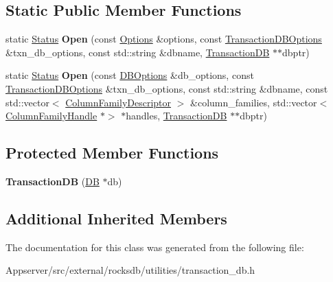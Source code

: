 \subsection*{Static Public Member Functions}
\begin{DoxyCompactItemize}
\item 
static \hyperlink{classrocksdb_1_1Status}{Status} {\bfseries Open} (const \hyperlink{structrocksdb_1_1Options}{Options} \&options, const \hyperlink{structrocksdb_1_1TransactionDBOptions}{Transaction\+D\+B\+Options} \&txn\+\_\+db\+\_\+options, const std\+::string \&dbname, \hyperlink{classrocksdb_1_1TransactionDB}{Transaction\+DB} $\ast$$\ast$dbptr)\hypertarget{classrocksdb_1_1TransactionDB_a56d2d44e92e2a3bc9d45644cd77dbfba}{}\label{classrocksdb_1_1TransactionDB_a56d2d44e92e2a3bc9d45644cd77dbfba}

\item 
static \hyperlink{classrocksdb_1_1Status}{Status} {\bfseries Open} (const \hyperlink{structrocksdb_1_1DBOptions}{D\+B\+Options} \&db\+\_\+options, const \hyperlink{structrocksdb_1_1TransactionDBOptions}{Transaction\+D\+B\+Options} \&txn\+\_\+db\+\_\+options, const std\+::string \&dbname, const std\+::vector$<$ \hyperlink{structrocksdb_1_1ColumnFamilyDescriptor}{Column\+Family\+Descriptor} $>$ \&column\+\_\+families, std\+::vector$<$ \hyperlink{classrocksdb_1_1ColumnFamilyHandle}{Column\+Family\+Handle} $\ast$$>$ $\ast$handles, \hyperlink{classrocksdb_1_1TransactionDB}{Transaction\+DB} $\ast$$\ast$dbptr)\hypertarget{classrocksdb_1_1TransactionDB_a3c98c8aa7463a03bef70a81a5be0323a}{}\label{classrocksdb_1_1TransactionDB_a3c98c8aa7463a03bef70a81a5be0323a}

\end{DoxyCompactItemize}
\subsection*{Protected Member Functions}
\begin{DoxyCompactItemize}
\item 
{\bfseries Transaction\+DB} (\hyperlink{classrocksdb_1_1DB}{DB} $\ast$db)\hypertarget{classrocksdb_1_1TransactionDB_a836c6527927fd23c8f3b5a3537b29dbc}{}\label{classrocksdb_1_1TransactionDB_a836c6527927fd23c8f3b5a3537b29dbc}

\end{DoxyCompactItemize}
\subsection*{Additional Inherited Members}


The documentation for this class was generated from the following file\+:\begin{DoxyCompactItemize}
\item 
Appserver/src/external/rocksdb/utilities/transaction\+\_\+db.\+h\end{DoxyCompactItemize}
